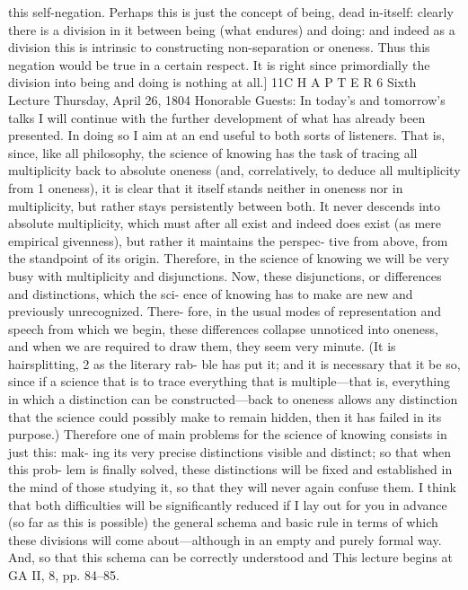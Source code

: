 this self-negation. Perhaps this is just the concept of being, dead in-itself: clearly
there is a division in it between being (what endures) and doing: and indeed
as a division this is intrinsic to constructing non-separation or oneness. Thus
this negation would be true in a certain respect. It is right since primordially
the division into being and doing is nothing at all.] 11C H A P T E R
6
Sixth Lecture
Thursday, April 26, 1804
Honorable Guests:
In today’s and tomorrow’s talks I will continue with the further development
of what has already been presented. In doing so I aim at an end useful to both
sorts of listeners. That is, since, like all philosophy, the science of knowing has
the task of tracing all multiplicity back to absolute oneness (and, correlatively,
to deduce all multiplicity from 1 oneness), it is clear that it itself stands neither
in oneness nor in multiplicity, but rather stays persistently between both. It
never descends into absolute multiplicity, which must after all exist and indeed
does exist (as mere empirical givenness), but rather it maintains the perspec-
tive from above, from the standpoint of its origin. Therefore, in the science of
knowing we will be very busy with multiplicity and disjunctions.
Now, these disjunctions, or differences and distinctions, which the sci-
ence of knowing has to make are new and previously unrecognized. There-
fore, in the usual modes of representation and speech from which we begin,
these differences collapse unnoticed into oneness, and when we are required
to draw them, they seem very minute. (It is hairsplitting, 2 as the literary rab-
ble has put it; and it is necessary that it be so, since if a science that is to trace
everything that is multiple—that is, everything in which a distinction can be
constructed—back to oneness allows any distinction that the science could
possibly make to remain hidden, then it has failed in its purpose.) Therefore
one of main problems for the science of knowing consists in just this: mak-
ing its very precise distinctions visible and distinct; so that when this prob-
lem is finally solved, these distinctions will be fixed and established in the
mind of those studying it, so that they will never again confuse them. I think
that both difficulties will be significantly reduced if I lay out for you in
advance (so far as this is possible) the general schema and basic rule in terms
of which these divisions will come about—although in an empty and purely
formal way. And, so that this schema can be correctly understood and
This lecture begins at GA II, 8, pp. 84–85.

